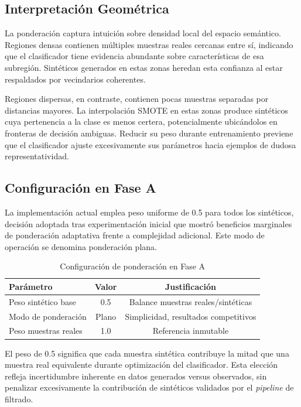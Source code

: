 \subsection{Interpretación Geométrica}
\label{subsec:interpretacion}

La ponderación captura intuición sobre densidad local del espacio semántico. Regiones densas contienen múltiples muestras reales cercanas entre sí, indicando que el clasificador tiene evidencia abundante sobre características de esa subregión. Sintéticos generados en estas zonas heredan esta confianza al estar respaldados por vecindarios coherentes.

Regiones dispersas, en contraste, contienen pocas muestras separadas por distancias mayores. La interpolación SMOTE en estas zonas produce sintéticos cuya pertenencia a la clase es menos certera, potencialmente ubicándolos en fronteras de decisión ambiguas. Reducir su peso durante entrenamiento previene que el clasificador ajuste excesivamente sus parámetros hacia ejemplos de dudosa representatividad.

\subsection{Configuración en Fase A}
\label{subsec:config_fase_a}

La implementación actual emplea peso uniforme de 0.5 para todos los sintéticos, decisión adoptada tras experimentación inicial que mostró beneficios marginales de ponderación adaptativa frente a complejidad adicional. Este modo de operación se denomina ponderación plana.

\begin{table}[h]
\centering
\caption{Configuración de ponderación en Fase A}
\label{tab:weight_config}
\begin{tabular}{lcc}
\hline
Parámetro & Valor & Justificación \\
\hline
Peso sintético base & 0.5 & Balance muestras reales/sintéticas \\
Modo de ponderación & Plano & Simplicidad, resultados competitivos \\
Peso muestras reales & 1.0 & Referencia inmutable \\
\hline
\end{tabular}
\end{table}

El peso de 0.5 significa que cada muestra sintética contribuye la mitad que una muestra real equivalente durante optimización del clasificador. Esta elección refleja incertidumbre inherente en datos generados versus observados, sin penalizar excesivamente la contribución de sintéticos validados por el \textit{pipeline} de filtrado.

